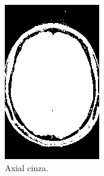 \documentclass{article}
\begin{document}
\begin{figure}[H]
\begin{subfigure}[b]{0.3\textwidth}
        \includegraphics[width=\textwidth]{brain/radiologist-axial-gray.png}
        \caption{Axial cinza.}
    \end{subfigure}
    ~
    \begin{subfigure}[b]{0.3\textwidth}

\end{subfigure}
\end{figure}
\end{document}
